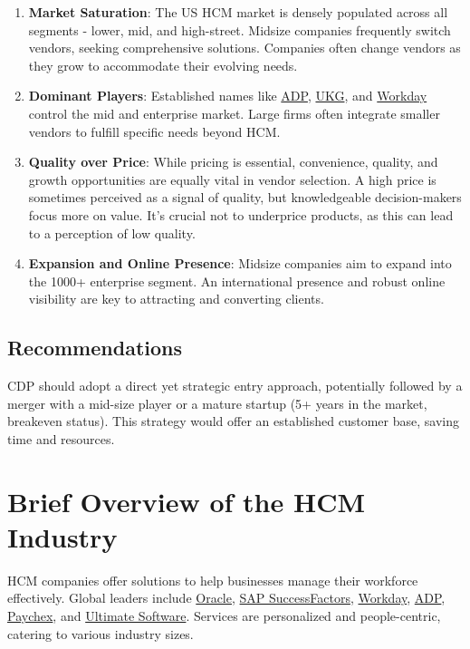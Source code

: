 \documentclass[
  a4paper,
]{book}
\renewcommand{\labelenumi}{\textbf{\textcolor{com-color}{\arabic*.}}}%
\begin{document}
\begin{enumerate}
\def\labelenumi{\arabic{enumi}.}
\item
  \textbf{Market Saturation}: The US HCM market is densely populated
  across all segments - lower, mid, and high-street. Midsize companies
  frequently switch vendors, seeking comprehensive solutions. Companies
  often change vendors as they grow to accommodate their evolving needs.
\item
  \textbf{Dominant Players}: Established names like
  \href{https://www.adp.com/}{ADP}, \href{https://www.ukg.com/}{UKG},
  and \href{https://www.workday.com/}{Workday} control the mid and
  enterprise market. Large firms often integrate smaller vendors to
  fulfill specific needs beyond HCM.
\item
  \textbf{Quality over Price}: While pricing is essential, convenience,
  quality, and growth opportunities are equally vital in vendor
  selection. A high price is sometimes perceived as a signal of quality,
  but knowledgeable decision-makers focus more on value. It's crucial
  not to underprice products, as this can lead to a perception of low
  quality.
\item
  \textbf{Expansion and Online Presence}: Midsize companies aim to
  expand into the 1000+ enterprise segment. An international presence
  and robust online visibility are key to attracting and converting
  clients.
\end{enumerate}

\hypertarget{recommendations}{%
\section{Recommendations}\label{recommendations}}

CDP should adopt a direct yet strategic entry approach, potentially
followed by a merger with a mid-size player or a mature startup (5+
years in the market, breakeven status). This strategy would offer an
established customer base, saving time and resources.

\hypertarget{brief-overview-of-the-hcm-industry}{%
\chapter{Brief Overview of the HCM
Industry}\label{brief-overview-of-the-hcm-industry}}

HCM companies offer solutions to help businesses manage their workforce
effectively. Global leaders include
\href{https://www.oracle.com/}{Oracle},
\href{https://www.sap.com/products/human-resources-hcm.html}{SAP
SuccessFactors}, \href{https://www.workday.com/}{Workday},
\href{https://www.adp.com/}{ADP},
\href{https://www.paychex.com/}{Paychex}, and
\href{https://www.ultimatesoftware.com/}{Ultimate Software}. Services
are personalized and people-centric, catering to various industry sizes.
\end{document}
